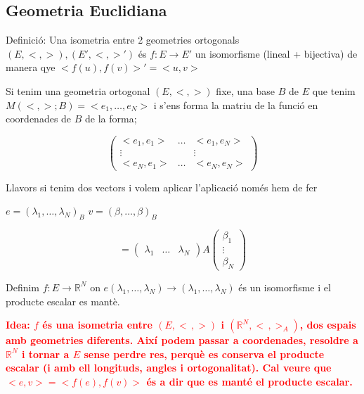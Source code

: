 \documentclass[12pt]{article}
\newcommand{\R}{\mathbb{R}}
\begin{document}
\subsection{Geometria Euclidiana}

\noindent Definició: Una isometria entre 2 geometries ortogonals $(E, <,>),(E',<,>')$ és $f: E \rightarrow E'$ un isomorfisme (lineal + bijectiva) de manera qye $<f(u), f(v)>' = < u,v>$

Si tenim una geometria ortogonal $(E, <,>)$ fixe, una base $B$ de $E$ que tenim $M(<,>; B) = <e_1, \dots, e_N>$ i s'ens forma la matriu de la funció en coordenades de $B$ de la forma;

\[\begin{pmatrix}
    <e_1,e_1> &\dots& <e_1, e_N>\\
    \vdots &&\vdots\\
    <e_N, e_1>& \dots & <e_N,e_N> 
\end{pmatrix}\]

Llavors si tenim dos vectors i volem aplicar l'aplicació només hem de fer

$e = (\lambda_1,\dots,\lambda_N)_B$
$v = (\beta,\dots,\beta)_B$

\[<e,v> = \begin{pmatrix}
    \lambda_1 & \dots & \lambda_N
\end{pmatrix}A\begin{pmatrix}
    \beta_1\\
    \vdots\\
    \beta_N
\end{pmatrix}\]

Definim $f: E \rightarrow \R^N$ on $e(\lambda_1,\dots,\lambda_N) \rightarrow (\lambda_1,\dots,\lambda_N)$ és un isomorfisme i el producte escalar es mantè. 

\textcolor{red}{\textbf{Idea: $f$ és una isometria entre $(E,<\,,>)$ i $(\R^N,<\,,>_A)$, dos espais amb geometries diferents. Així podem passar a coordenades, resoldre a $\R^N$ i tornar a $E$ sense perdre res, perquè es conserva el producte escalar (i amb ell longituds, angles i ortogonalitat). Cal veure que $< e,v>=< f(e),f(v)>$ és a dir que es manté el producte escalar.}}
\end{document}

